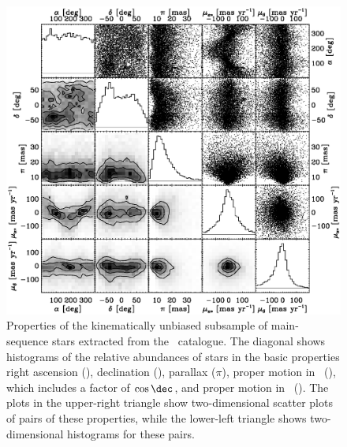 
\clearpage
\begin{figure}
\includegraphics[width=\textwidth]{hipparcos2_properties.ps}
\caption{Properties of the kinematically unbiased subsample of main-sequence stars extracted from the \Hipparcos\ catalogue. The diagonal shows histograms of the relative abundances of stars in the basic properties right ascension (\ra), declination (\dec), parallax ($\pi$), proper motion in \ra\ (\pmrastar), which includes a factor of $\cos \dec$, and proper motion in \dec\ (\pmdec). The plots in the upper-right triangle show two-dimensional scatter plots of pairs of these properties, while the lower-left triangle shows two-dimensional histograms for these pairs.}%
\label{fig:hip2prop}%
\end{figure}

